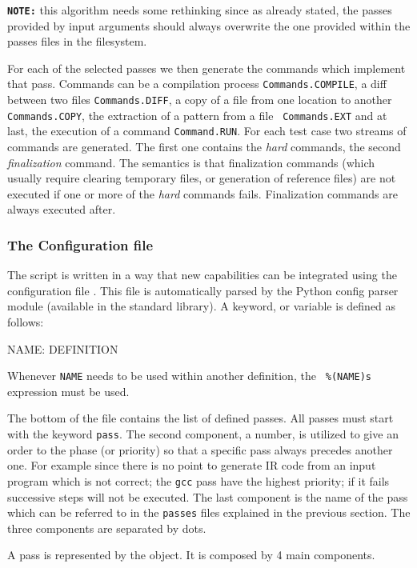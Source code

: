 {\tt\bf NOTE:} this algorithm needs some rethinking since as already stated, the
passes provided by input arguments should always overwrite the one provided
within the passes files in the filesystem. 


For each of the selected passes we then generate the commands which implement
that pass. Commands can be a compilation process {\tt Commands.COMPILE}, a diff
between two files {\tt Commands.DIFF}, a copy of a file from one location to
another {\tt Commands.COPY}, the extraction of a pattern from a file {\tt
Commands.EXT} and at last, the execution of a command {\tt Command.RUN}. For
each test case two streams of commands are generated. The first one contains the
{\em hard} commands, the second {\em finalization} command. The semantics is
that finalization commands (which usually require clearing temporary files, or
generation of reference files) are not executed if one or more of the {\em hard}
commands fails. Finalization commands are always executed after.

\subsubsection{The Configuration file}

The script is written in a way that new capabilities can be integrated using the
configuration file . This file is automatically parsed by
the Python config parser module (available in the standard library). A keyword,
or variable is defined as follows:

\begin{srcCode}
NAME:	DEFINITION
\end{srcCode}

Whenever {\tt NAME} needs to be used within another definition, the {\tt
\%(NAME)s} expression must be used. 

The bottom of the file contains the list of defined passes. All passes must
start with the keyword {\tt pass}. The second component, a number, is utilized
to give an order to the phase (or priority) so that a specific pass always
precedes another one. For example since there is no point to generate IR code
from an input program which is not correct; the {\tt gcc} pass have the highest
priority; if it fails successive steps will not be executed. The last component
is the name of the pass which can be referred to in the {\tt passes} files
explained in the previous section. The three components are separated by dots. 

A pass is represented by the  object. It is composed by 4 main
components. 


